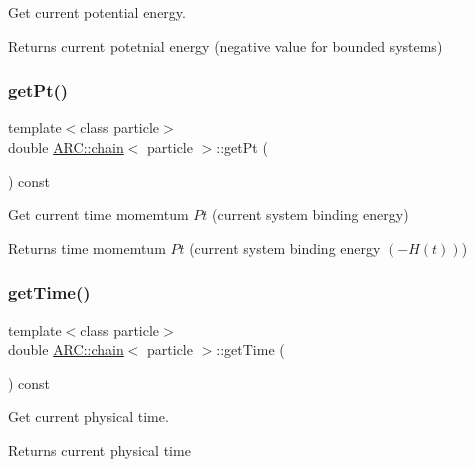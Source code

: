 Get current potential energy. 

\begin{DoxyReturn}{Returns}
current potetnial energy (negative value for bounded systems) 
\end{DoxyReturn}
\hypertarget{classARC_1_1chain_adbda281b80afe23f4b23d6a775046121}{}\label{classARC_1_1chain_adbda281b80afe23f4b23d6a775046121} 
\subsubsection{\texorpdfstring{get\+Pt()}{getPt()}}
{\footnotesize\ttfamily template$<$class particle$>$ \\
double \hyperlink{classARC_1_1chain}{A\+R\+C\+::chain}$<$ particle $>$\+::get\+Pt (\begin{DoxyParamCaption}{ }\end{DoxyParamCaption}) const\hspace{0.3cm}{\ttfamily [inline]}}



Get current time momemtum $Pt$ (current system binding energy) 

\begin{DoxyReturn}{Returns}
time momemtum $Pt$ (current system binding energy $(-H(t))$) 
\end{DoxyReturn}
\hypertarget{classARC_1_1chain_a48bde99d89b99df54844e1331d4814bb}{}\label{classARC_1_1chain_a48bde99d89b99df54844e1331d4814bb} 
\subsubsection{\texorpdfstring{get\+Time()}{getTime()}}
{\footnotesize\ttfamily template$<$class particle$>$ \\
double \hyperlink{classARC_1_1chain}{A\+R\+C\+::chain}$<$ particle $>$\+::get\+Time (\begin{DoxyParamCaption}{ }\end{DoxyParamCaption}) const\hspace{0.3cm}{\ttfamily [inline]}}



Get current physical time. 

\begin{DoxyReturn}{Returns}
current physical time 
\end{DoxyReturn}
\hypertarget{classARC_1_1chain_a122985d69620f87c68ae43f4c87e4f00}{}\label{classARC_1_1chain_a122985d69620f87c68ae43f4c87e4f00} 
